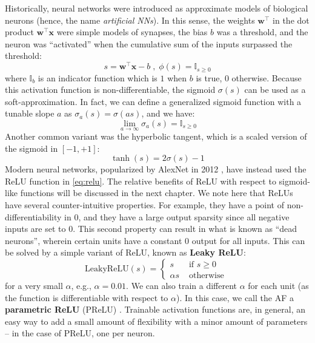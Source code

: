 Historically, neural networks were introduced as approximate models of biological neurons (hence, the name \textit{artificial NNs}). In this sense, the weights $\mathbf{w}^\top$ in the dot product $\mathbf{w}^\top \mathbf{x}$ were simple models of synapses, the bias $b$ was a threshold, and the neuron was “activated” when the cumulative sum of the inputs surpassed the threshold:
%
$$
s = \mathbf{w}^\top\mathbf{x}-b \;,\; \phi(s)= \mathbb{I}_{s \ge 0}
$$
%
where $\mathbb{I}_{b}$ is an indicator function which is $1$ when $b$ is true, $0$ otherwise. Because this activation function is non-differentiable, the sigmoid $\sigma(s)$ can be used as a soft-approximation. In fact, we can define a generalized sigmoid function with a tunable slope $a$ as $\sigma_a(s) = \sigma(as)$, and we have:
%
$$
\lim_{a \rightarrow \infty}\sigma_a(s)=\mathbb{I}_{s \ge 0}
$$
%
Another common variant was the hyperbolic tangent, which is a scaled version of the sigmoid in $[-1,+1]$:
%
$$
\tanh(s)=2\sigma(s)-1
$$
%
Modern neural networks, popularized by AlexNet in 2012 \cite{krizhevsky2012imagenet}, have instead used the ReLU function in \eqref{eq:relu}. The relative benefits of ReLU with respect to sigmoid-like functions will be discussed in the next chapter. We note here that ReLUs have several counter-intuitive properties. For example, they have a point of non-differentiability in $0$, and they have a large output sparsity since all negative inputs are set to $0$. This second property can result in what is known as “dead neurons”, wherein certain units have a constant $0$ output for all inputs. This can be solved by a simple variant of ReLU, known as \textbf{Leaky ReLU}:
%
\begin{equation}
\text{LeakyReLU}(s) = \begin{cases} s & \text{ if } s \ge 0 \\ \alpha s & \text{ otherwise } \end{cases} 
\label{eq:leaky_relu}
\end{equation}
%
for a very small $\alpha$, e.g., $\alpha = 0.01$. We can also train a different $\alpha$ for each unit (as the function is differentiable with respect to $\alpha$). In this case, we call the AF a \textbf{parametric ReLU} (PReLU) \cite{he2015delving}. Trainable activation functions are, in general, an easy way to add a small amount of flexibility with a minor amount of parameters -- in the case of PReLU, one per neuron.

